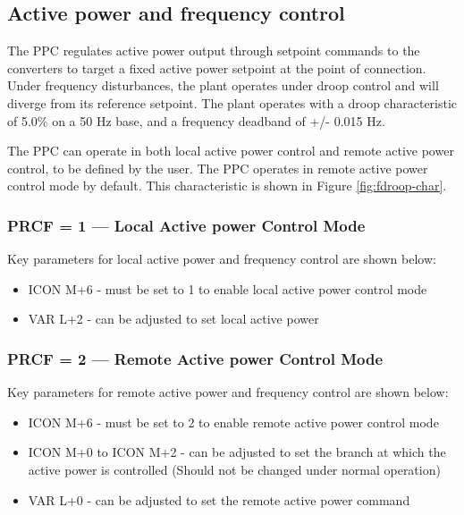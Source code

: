 \documentclass{../grid-link-report}
\begin{document}
	\subsection{Active power and frequency control}
	
	The \ac{PPC} regulates active power output through setpoint commands to the converters to target a fixed active power setpoint at the point of connection. Under frequency disturbances, the plant operates under droop control and will diverge from its reference setpoint. The plant operates with a droop characteristic of 5.0\% on a 50 Hz base, and a frequency deadband of +/- 0.015 Hz. 
	
	The PPC can operate in both local active power control and remote active power control, to be defined by the user. The PPC operates in remote active power control mode by default. This characteristic is shown in Figure \ref{fig:fdroop-char}. 
	\subsubsection{PRCF = 1 — Local Active power Control Mode}
	
	Key parameters for local active power and frequency control are shown below: 
	
	\begin{itemize}
		\item ICON M+6 - must be set to 1 to enable local active power control mode
		\item VAR L+2 - can be adjusted to set local active power
	\end{itemize}
	
	\subsubsection{PRCF = 2 — Remote Active power Control Mode}

	Key parameters for remote active power and frequency control are shown below: 

	\begin{itemize}
		\item ICON M+6 - must be set to 2 to enable remote active power control mode
		\item ICON M+0 to ICON M+2 - can be adjusted to set the branch at which the active power is controlled (Should not be changed under normal operation)
		\item VAR L+0 - can be adjusted to set the remote active power command
	\end{itemize}
	
\end{document}
